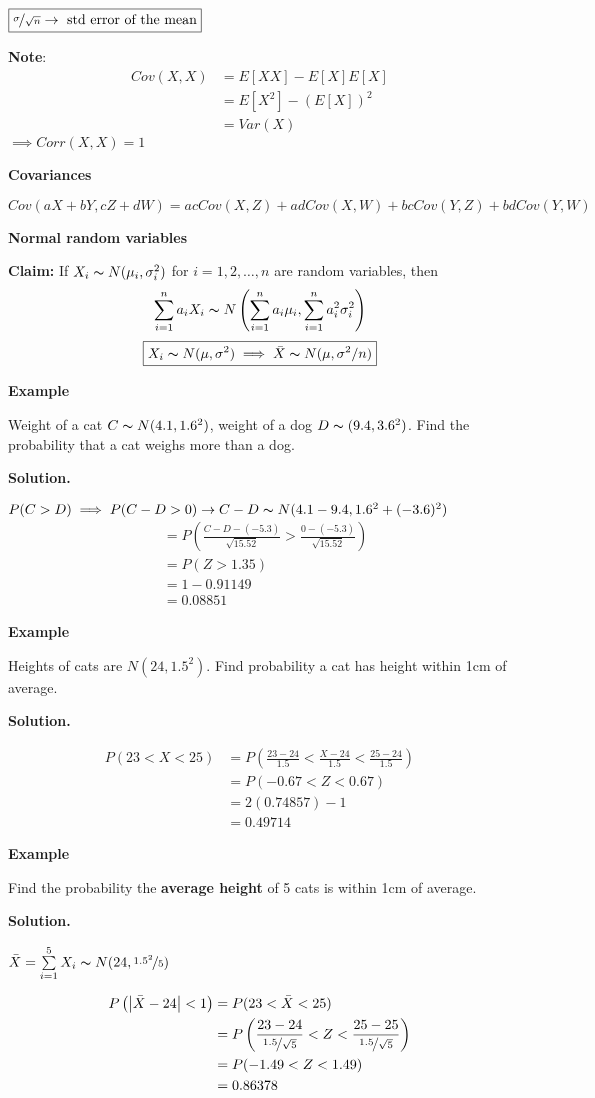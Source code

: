 $\boxed{\nicefrac{\sigma}{\sqrt{n}}\rightarrow\text{ std error of the mean}}$

\textbf{Note}:
\begin{align*}
    Cov(X,X)
    &=E[XX]-E[X]E[X]\\
    &=E[X^2]-(E[X])^2\\
    &=Var(X)
\end{align*}
$ \implies Corr(X,X)=1 $

\textbf{Covariances}

$ Cov(aX+bY,cZ+dW)=acCov(X,Z)+adCov(X,W)+bcCov(Y,Z)+bdCov(Y,W) $

\textbf{Normal random variables
}

\textbf{Claim:}
If $ X_i \thicksim N(\mu_i,\sigma_i^2) $ for $ i=1,2,\ldots ,n $
are random variables, then
\[ \sum\limits_{i=1}^{n} a_i X_i \thicksim 
N\left(\sum\limits_{i=1}^{n}a_i\mu_i,\sum\limits_{i=1}^{n} a_i^2\sigma_i^2\right) \]
\[ \boxed{X_i \thicksim N(\mu,\sigma^2)\implies\bar{X} \thicksim N(\mu,\sigma^2/n)} \]

\textbf{Example}

Weight of a cat $ C \thicksim N(4.1,1.6^2) $, weight of a dog
$ D \thicksim (9.4,3.6^2) $. Find the probability that a cat weighs more than
a dog.

\textbf{Solution.}

$ P(C>D)\implies P(C-D>0)\rightarrow C-D \thicksim N(4.1-9.4,1.6^2+(-3.6)^2)$
\begin{align*}
    &=P\left(\frac{C-D-(-5.3)}{\sqrt{15.52}}>\frac{0-(-5.3)}{\sqrt{15.52}}\right)\\
    &=P(Z>1.35)\\
    &=1-0.91149\\
    &=0.08851
\end{align*}

\textbf{Example}

Heights of cats are $ N(24,1.5^2) $. Find probability a cat has height
within 1cm of average.

\textbf{Solution.}

\begin{align*}
    P(23<X<25)&=
    P\left( \frac{23-24}{1.5}<\frac{X-24}{1.5}<\frac{25-24}{1.5} \right)\\
    &=P(-0.67<Z<0.67)\\
    &=2(0.74857)-1\\
    &=0.49714
\end{align*}

\textbf{Example}

Find the probability the \textbf{average height} of 5 cats is within 1cm of average.

\textbf{Solution.}

$ \bar{X}=\sum\limits_{i=1}^{5} X_i \thicksim N(24,\nicefrac{1.5^2}{5}) $

\begin{align*}
    P\left(\left|\bar{X}-24\right|<1\right)&=
    P(23<\bar{X}<25)\\
    &=P\left( \frac{23-24}{\nicefrac{1.5}{\sqrt{5}}}<Z<
    \frac{25-25}{\nicefrac{1.5}{\sqrt{5}}} \right)\\
    &=P(-1.49<Z<1.49)\\
    &=0.86378
\end{align*}
